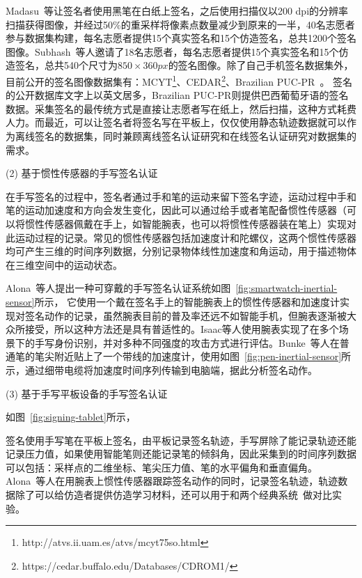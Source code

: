 Madasu~\cite{Hanmandlu2005Off}等让签名者使用黑笔在白纸上签名，之后使用扫描仪以200 dpi的分辨率扫描获得图像，并经过50\%的重采样将像素点数量减少到原来的一半，40名志愿者参与数据集构建，每名志愿者提供15个真实签名和15个仿造签名，总共1200个签名图像。Subhash~\cite{chandra2016offline}等人邀请了18名志愿者，每名志愿者提供15个真实签名和15个仿造签名，总共540个尺寸为$850\times360px$的签名图像。除了自己手机签名数据集外，目前公开的签名图像数据集有：MCYT\footnote{http://atvs.ii.uam.es/atvs/mcyt75so.html}、CEDAR\footnote{https://cedar.buffalo.edu/Databases/CDROM1/}、Brazilian PUC-PR~\cite{freitas2008brazilian}。 签名的公开数据库文字上以英文居多，Brazilian PUC-PR则提供巴西葡萄牙语的签名数据。采集签名的最传统方式是直接让志愿者写在纸上，然后扫描，这种方式耗费人力。而最近，可以让签名者将签名写在平板上，仅仅使用静态轨迹数据就可以作为离线签名的数据集，同时兼顾离线签名认证研究和在线签名认证研究对数据集的需求。

(2) 基于惯性传感器的手写签名认证
  
在手写签名的过程中，签名者通过手和笔的运动来留下签名字迹，运动过程中手和笔的运动加速度和方向会发生变化，因此可以通过给手或者笔配备惯性传感器（可以将惯性传感器佩戴在手上，如智能腕表，也可以将惯性传感器装在笔上）实现对此运动过程的记录。常见的惯性传感器包括加速度计和陀螺仪，这两个惯性传感器均可产生三维的时间序列数据，分别记录物体线性加速度和角运动，用于描述物体在三维空间中的运动状态。

Alona~\cite{Levy2018Handwritten}等人提出一种可穿戴的手写签名认证系统如图~\ref{fig:smartwatch-inertial-sensor}所示，
它使用一个戴在签名手上的智能腕表上的惯性传感器和加速度计实现对签名动作的记录，虽然腕表目前的普及率还远不如智能手机，但腕表逐渐被大众所接受，所以这种方法还是具有普适性的。Isaac\cite{8698222}等人使用腕表实现了在多个场景下的手写身份识别，并对多种不同强度的攻击方式进行评估。Bunke~\cite{Bunke2015Online}等人在普通笔的笔尖附近贴上了一个带线的加速度计，使用如图~\ref{fig:pen-inertial-sensor}所示，通过细带电缆将加速度时间序列传输到电脑端，据此分析签名动作。

(3) 基于手写平板设备的手写签名认证


如图~\ref{fig:signing-tablet}所示，

签名使用手写笔在平板上签名，由平板记录签名轨迹，手写屏除了能记录轨迹还能记录压力值，如果使用智能笔则还能记录笔的倾斜角，因此采集到的时间序列数据可以包括：采样点的二维坐标、笔尖压力值、笔的水平偏角和垂直偏角。Alona~\cite{Levy2018Handwritten}等人在用腕表上惯性传感器跟踪签名动作的同时，记录签名轨迹，轨迹数据除了可以给仿造者提供仿造学习材料，还可以用于和两个经典系统~\cite{fischer2015robust,kholmatov2005identity}做对比实验。


